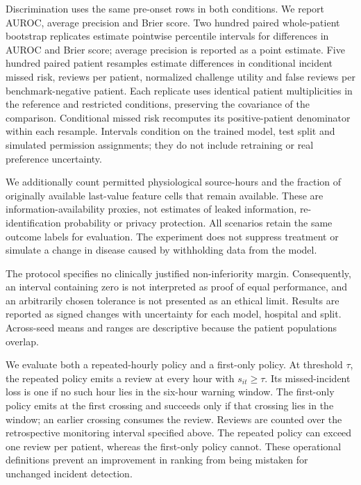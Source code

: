 Discrimination uses the same pre-onset rows in both conditions. We report AUROC, average precision and Brier score. Two hundred paired whole-patient bootstrap replicates estimate pointwise percentile intervals for differences in AUROC and Brier score; average precision is reported as a point estimate. Five hundred paired patient resamples estimate differences in conditional incident missed risk, reviews per patient, normalized challenge utility and false reviews per benchmark-negative patient. Each replicate uses identical patient multiplicities in the reference and restricted conditions, preserving the covariance of the comparison. Conditional missed risk recomputes its positive-patient denominator within each resample. Intervals condition on the trained model, test split and simulated permission assignments; they do not include retraining or real preference uncertainty.

We additionally count permitted physiological source-hours and the fraction of originally available last-value feature cells that remain available. These are information-availability proxies, not estimates of leaked information, re-identification probability or privacy protection. All scenarios retain the same outcome labels for evaluation. The experiment does not suppress treatment or simulate a change in disease caused by withholding data from the model.

The protocol specifies no clinically justified non-inferiority margin. Consequently, an interval containing zero is not interpreted as proof of equal performance, and an arbitrarily chosen tolerance is not presented as an ethical limit. Results are reported as signed changes with uncertainty for each model, hospital and split. Across-seed means and ranges are descriptive because the patient populations overlap.


We evaluate both a repeated-hourly policy and a first-only policy. At threshold $\tau$, the repeated policy emits a review at every hour with $s_{it}\ge\tau$. Its missed-incident loss is one if no such hour lies in the six-hour warning window. The first-only policy emits at the first crossing and succeeds only if that crossing lies in the window; an earlier crossing consumes the review. Reviews are counted over the retrospective monitoring interval specified above. The repeated policy can exceed one review per patient, whereas the first-only policy cannot. These operational definitions prevent an improvement in ranking from being mistaken for unchanged incident detection.

